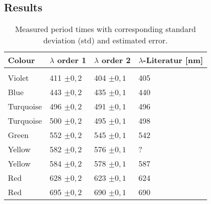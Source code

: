 \subsection{Results}


\begin{table}[ht]
	\begin{tabularx}{\textwidth}{XM{3cm}M{3cm}M{3cm}}%
		\toprule 
		\textbf{Colour}& \textbf{$\lambda$ order 1} \qquad [\si{\nano\m}]  &  \textbf{$\lambda$ order 2}\qquad [\si{\nano\m}]  & \textbf{$\lambda$-Literatur} [\si{\nano\m}]  \\
		\hline
		&&&\\[-5pt]
		Violet		& 411 $\pm 0,2$  & 404 $\pm 0,1$ & 405	\\[5pt]
		Blue		& 443 $\pm 0,2$  & 435 $\pm 0,1$ & 440	\\[5pt]
		Turquoise	& 496 $\pm 0,2$  & 491 $\pm 0,1$ & 496	\\[5pt]
		Turquoise	& 500 $\pm 0,2$  & 495 $\pm 0,1$ & 498	\\[5pt]
		Green		& 552 $\pm 0,2$  & 545 $\pm 0,1$ & 542 \\[5pt]
		Yellow		& 582 $\pm 0,2$  & 576 $\pm 0,1$ & ?	\\[5pt]
		Yellow		& 584 $\pm 0,2$  & 578 $\pm 0,1$ & 587	\\[5pt]
		Red			& 628 $\pm 0,2$  & 623 $\pm 0,1$ & 624	\\[5pt]
		Red			& 695 $\pm 0,2$  & 690 $\pm 0,1$ & 690	\\[5pt]
		\bottomrule 
	\end{tabularx}
	\caption{Measured period times with corresponding standard deviation (std) and estimated error.}
	\label{tab::period}
\end{table}